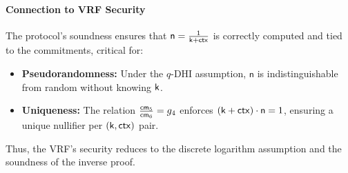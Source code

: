 \paragraph{Connection to VRF Security}
The protocol’s soundness ensures that $\textsf{n} = \frac{1}{\mathsf{k} + \mathsf{ctx}}$ is correctly computed and tied to the commitments, critical for:
\begin{itemize}
    \item \textbf{Pseudorandomness:} Under the $q$-DHI assumption, $\textsf{n}$ is indistinguishable from random without knowing $\mathsf{k}$.
    \item \textbf{Uniqueness:} The relation $\frac{\mathsf{cm}_5}{\mathsf{cm}_6} = g_4$ enforces $(\mathsf{k} + \mathsf{ctx}) \cdot \textsf{n} = 1$, ensuring a unique nullifier per $(\mathsf{k}, \mathsf{ctx})$ pair.
\end{itemize}
Thus, the VRF’s security reduces to the discrete logarithm assumption and the soundness of the inverse proof.






















































































